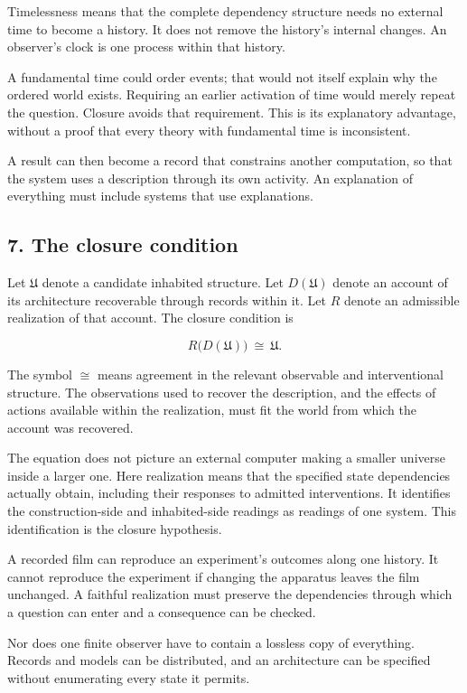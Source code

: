 \documentclass[
  11pt,
]{article}
\begin{document}
Timelessness means that the complete dependency structure needs no
external time to become a history. It does not remove the history's
internal changes. An observer's clock is one process within that
history.

A fundamental time could order events; that would not itself explain why
the ordered world exists. Requiring an earlier activation of time would
merely repeat the question. Closure avoids that requirement. This is its
explanatory advantage, without a proof that every theory with
fundamental time is inconsistent.

A result can then become a record that constrains another computation,
so that the system uses a description through its own activity. An
explanation of everything must include systems that use explanations.

\subsection{7. The closure condition}\label{the-closure-condition}

Let \(\mathfrak U\) denote a candidate inhabited structure. Let
\(D(\mathfrak U)\) denote an account of its architecture recoverable
through records within it. Let \(R\) denote an admissible realization of
that account. The closure condition is

\[
  R\bigl(D(\mathfrak U)\bigr)\ \cong\ \mathfrak U.
\]

The symbol \(\cong\) means agreement in the relevant observable and
interventional structure. The observations used to recover the
description, and the effects of actions available within the
realization, must fit the world from which the account was recovered.

The equation does not picture an external computer making a smaller
universe inside a larger one. Here realization means that the specified
state dependencies actually obtain, including their responses to
admitted interventions. It identifies the construction-side and
inhabited-side readings as readings of one system. This identification
is the closure hypothesis.

A recorded film can reproduce an experiment's outcomes along one
history. It cannot reproduce the experiment if changing the apparatus
leaves the film unchanged. A faithful realization must preserve the
dependencies through which a question can enter and a consequence can be
checked.

Nor does one finite observer have to contain a lossless copy of
everything. Records and models can be distributed, and an architecture
can be specified without enumerating every state it permits.
\end{document}
